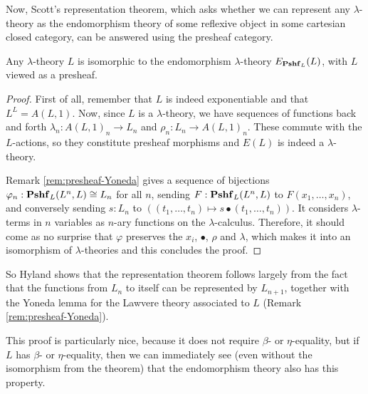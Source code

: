 Now, Scott's representation theorem, which asks whether we can represent any $ \lambda $-theory as the endomorphism theory of some reflexive object in some cartesian closed category, can be answered using the presheaf category.
\begin{theorem}\label{thm:representation-theorem}
  Any $ \lambda $-theory $ L $ is isomorphic to the endomorphism $ \lambda $-theory $ E_{\mathbf{Pshf}_{L}}(L) $, with $ L $ viewed as a presheaf.
\end{theorem}
\begin{proof}
  First of all, remember that $ L $ is indeed exponentiable and that $ L^L = A(L, 1) $.
  Now, since $ L $ is a $ \lambda $-theory, we have sequences of functions back and forth $ \lambda_n: A(L, 1)_n \to L_n $ and $ \rho_n: L_n \to A(L, 1)_n $. These commute with the $ L $-actions, so they constitute presheaf morphisms and $ E(L) $ is indeed a $ \lambda $-theory.

  Remark \ref{rem:presheaf-Yoneda} gives a sequence of bijections $ \varphi_n : \mathbf{Pshf}_{L}(L^n, L) \cong L_n $ for all $ n $, sending $ F: \mathbf{Pshf}_{L}(L^n, L) $ to $ F(x_1, \dots, x_n) $, and conversely sending $ s: L_n $ to $ ((t_1, \dots, t_n) \mapsto s \bullet (t_1, \dots, t_n)) $. It considers $ \lambda $-terms in $ n $ variables as $ n $-ary functions on the $ \lambda $-calculus. Therefore, it should come as no surprise that $ \varphi $ preserves the $ x_i $, $ \bullet $, $ \rho $ and $ \lambda $, which makes it into an isomorphism of $ \lambda $-theories and this concludes the proof.
\end{proof}
So Hyland shows that the representation theorem follows largely from the fact that the functions from $ L_n $ to itself can be represented by $ L_{n + 1} $, together with the Yoneda lemma for the Lawvere theory associated to $ L $ (Remark \ref{rem:presheaf-Yoneda}).

This proof is particularly nice, because it does not require $ \beta $- or $ \eta $-equality, but if $ L $ has $ \beta $- or $ \eta $-equality, then we can immediately see (even without the isomorphism from the theorem) that the endomorphism theory also has this property.

